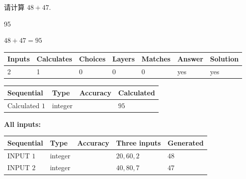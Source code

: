 \documentclass{ctexart}
\begin{document}
  
 
请计算 $ %
48 +  %
47 $.
 
 
 
\noindent{}
 
 

95
 
 
\noindent{}
 
 

 
 
 
\noindent{}
 
 

$ %
48 +  %
47=   %
95$
 
 
\noindent{}
 
 

 
   
   
   
   
\noindent\begin{tabular}{|l|l|l|l|l|l|l|}
 \hline
Inputs & Calculates & Choices & Layers & Matches & Answer & Solution \\ \hline
 2  & 
 1  & 
 0
  & 
 0  & 
 0  & 
  yes & 
  yes 
  \\ \hline
 \end{tabular}
   
   
   
   
\noindent{}
   
   
  
  
\noindent\begin{tabular}{|l|l|l|l|}
\hline
 Sequential & Type & Accuracy & Calculated \\ 
\hline
 
 
  Calculated $  1 $ & integer &  & 
  $ 95 $ 
 \\  \hline  
 \end{tabular}
   
   
   
   
\noindent\vspace{0.1in}\hspace{-0.08in} {\textbf{\Large{All inputs: }}}
   
   
  
  
\noindent\begin{tabular}{|l|l|l|l|l|}
\hline
 Sequential & Type & Accuracy & Three inputs & Generated \\ 
\hline
 
 
  INPUT $  1 $ & integer &  & $
 20
 , 
 60
 , 
 2
 $ & $ 48 $ 
 \\  \hline  
 
 
  INPUT $  2 $ & integer &  & $
 40
 , 
 80
 , 
 7
 $ & $ 47 $ 
 \\  \hline  
 \end{tabular}
   
\end{document}
